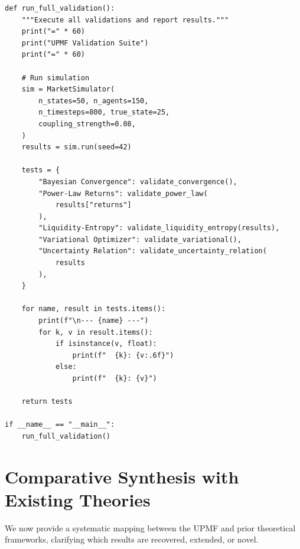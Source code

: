 \documentclass[12pt,a4paper]{article}
\theoremstyle{definition}
\begin{document}
\begin{lstlisting}[caption={Integrated validation harness},label=lst:val_all]
def run_full_validation():
    """Execute all validations and report results."""
    print("=" * 60)
    print("UPMF Validation Suite")
    print("=" * 60)
    
    # Run simulation
    sim = MarketSimulator(
        n_states=50, n_agents=150,
        n_timesteps=800, true_state=25,
        coupling_strength=0.08,
    )
    results = sim.run(seed=42)
    
    tests = {
        "Bayesian Convergence": validate_convergence(),
        "Power-Law Returns": validate_power_law(
            results["returns"]
        ),
        "Liquidity-Entropy": validate_liquidity_entropy(results),
        "Variational Optimizer": validate_variational(),
        "Uncertainty Relation": validate_uncertainty_relation(
            results
        ),
    }
    
    for name, result in tests.items():
        print(f"\n--- {name} ---")
        for k, v in result.items():
            if isinstance(v, float):
                print(f"  {k}: {v:.6f}")
            else:
                print(f"  {k}: {v}")
    
    return tests

if __name__ == "__main__":
    run_full_validation()
\end{lstlisting}



\section{Comparative Synthesis with Existing Theories}\label{sec:comparison}

We now provide a systematic mapping between the UPMF and prior theoretical frameworks, clarifying which results are recovered, extended, or novel.
\end{document}
